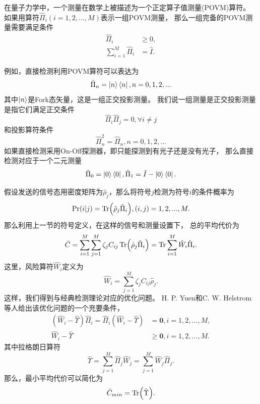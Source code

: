 在量子力学中，一个测量在数学上被描述为一个正定算子值测量(POVM)算符\cite{helstrom1976quantum}。
如果用算符$\hat{\Pi}_i (i=1,2,...,M)$表示一组POVM测量，
那么一组完备的POVM测量需要满足条件
\begin{equation}
\begin{split}
\hat{\Pi}_i & \ge 0, \\
\sum_{i=1}^M \hat{\Pi}_i & = \hat{I}.
\end{split}
\end{equation}

例如，直接检测利用POVM算符可以表达为
\begin{equation}
\hat{\Pi}_n = \ket{n}\bra{n}, n=0,1,2,...
\end{equation}
其中$\ket{n}$是Fork态矢量，这是一组正交投影测量。
我们说一组测量是正交投影测量是指它们满足正交条件
\begin{equation}
\hat{\Pi}_i \hat{\Pi}_j = 0, \forall i \neq j
\end{equation}
和投影算符条件
\begin{equation}
\hat{\Pi}_n^2 = \hat{\Pi}_n, n=0,1,2,...
\end{equation}
如果直接检测采用On-Off探测器，即只能探测到有光子还是没有光子，
那么直接检测对应于一个二元测量
\begin{equation}
\hat{\Pi}_0 = \ket{0}\bra{0}, \hat{\Pi}_1 = \hat{I} - \ket{0}\bra{0}.
\end{equation}


假设发送的信号态用密度矩阵为$\hat{\rho}_j$，那么将符号$j$检测为符号$i$的条件概率为
\begin{equation}
\Pr(i|j) = \Tr(\hat{\rho}_j \hat{\Pi}_i), (i,j)=1,2,...,M.
\end{equation}
那么利用上一节的符号定义，在这样的信号和测量设置下，
总的平均代价为
\begin{equation}
\bar{C} =  \sum_{i=1}^M \sum_{j=1}^M \zeta_jC_{ij} \Tr(\hat{\rho}_j \hat{\Pi}_i) \\
        =  \Tr \sum_{i=1}^M \hat{W}_i \hat{\Pi}_i.
\label{eq:q-avg-C}
\end{equation}
这里，风险算符$\hat{W}_i$定义为
\begin{equation}
\hat{W}_i = \sum_{j=1}^M \zeta_jC_{ij}\hat{\rho}_j.
\end{equation}
这样，我们得到与经典检测理论对应的优化问题。
H. P. Yuen和C. W. Helstrom等人给出该优化问题的一个充要条件，
\begin{equation}
\begin{split}
(\hat{W}_i - \hat{\Upsilon})\hat{\Pi}_i = \hat{\Pi}_i(\hat{W}_i - \hat{\Upsilon}) & = \bm{0}, i=1,2,...,M,  \\
\hat{W}_i - \hat{\Upsilon} & \ge \bm{0}, i=1,2,...,M.
\label{eq:optim-povm-cond}
\end{split}
\end{equation}
其中拉格朗日算符
\begin{equation}
\hat{\Upsilon} = \sum_{j=1}^M \hat{\Pi}_j\hat{W}_j = \sum_{j=1}^M\hat{W}_j\hat{\Pi}_j.
\end{equation}
那么，最小平均代价可以简化为
\begin{equation}
\bar{C}_{min} = \Tr(\hat{\Upsilon}).
\end{equation}


